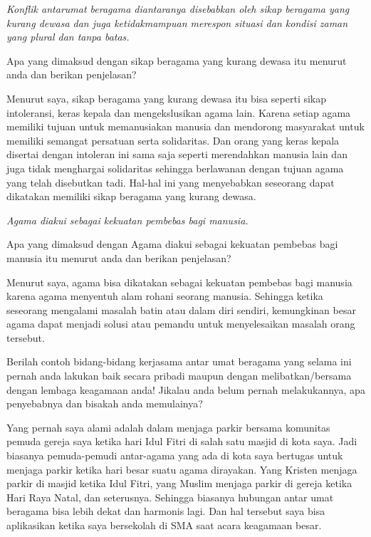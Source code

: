 \documentclass[a4paper,11pt,answers]{exam}
\begin{document}
    \begin{questions}
        \question \emph{Konflik antarumat beragama diantaranya disebabkan oleh sikap 
        beragama yang kurang dewasa dan juga ketidakmampuan merespon situasi dan
        kondisi zaman yang plural dan tanpa batas.} \par
        Apa yang dimaksud dengan sikap beragama yang kurang dewasa itu menurut anda dan berikan penjelasan?

        \begin{solution}
            Menurut saya, sikap beragama yang kurang dewasa itu bisa seperti sikap intoleransi, keras kepala
            dan mengekslusikan agama lain. Karena setiap agama memiliki tujuan untuk memanusiakan manusia dan
            mendorong masyarakat untuk memiliki semangat persatuan serta solidaritas. Dan orang yang keras kepala
            disertai dengan intoleran ini sama saja seperti merendahkan manusia lain dan juga tidak menghargai 
            solidaritas sehingga berlawanan dengan tujuan agama yang telah disebutkan tadi. Hal-hal ini yang
            menyebabkan seseorang dapat dikatakan memiliki sikap beragama yang kurang dewasa.
        \end{solution}
 
        \question \emph{Agama diakui sebagai kekuatan pembebas bagi manusia.} \par
        Apa yang dimaksud dengan Agama diakui sebagai kekuatan pembebas bagi manusia itu menurut anda dan berikan penjelasan?

        \begin{solution}
            Menurut saya, agama bisa dikatakan sebagai kekuatan pembebas bagi manusia karena agama menyentuh alam rohani seorang manusia. Sehingga ketika seseorang mengalami masalah batin atau dalam diri sendiri, kemungkinan besar agama dapat menjadi solusi atau pemandu untuk menyelesaikan masalah orang tersebut.
        \end{solution}
 
        \question Berilah contoh bidang-bidang kerjasama antar umat beragama yang selama ini pernah anda lakukan baik secara pribadi maupun dengan melibatkan/bersama dengan lembaga keagamaan anda! Jikalau anda belum pernah melakukannya, apa penyebabnya dan bisakah anda memulainya?

        \begin{solution}
            Yang pernah saya alami adalah dalam menjaga parkir bersama komunitas pemuda gereja saya ketika hari Idul Fitri di salah satu masjid di kota saya. Jadi biasanya pemuda-pemudi antar-agama yang ada di kota saya bertugas untuk menjaga parkir ketika hari besar suatu agama dirayakan. Yang Kristen menjaga parkir di masjid ketika Idul Fitri, yang Muslim menjaga parkir di gereja ketika Hari Raya Natal, dan seterusnya. Sehingga biasanya hubungan antar umat beragama bisa lebih dekat dan harmonis lagi. Dan hal tersebut saya bisa aplikasikan ketika saya bersekolah di SMA saat acara keagamaan besar.
        \end{solution}

    \end{questions}
\end{document}
